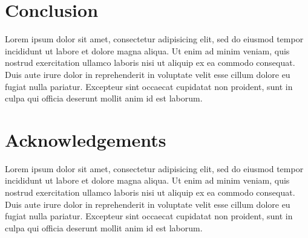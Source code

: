 \documentclass[conference]{acmsiggraph}
\begin{document}
\section{Conclusion}
\label{sec:conclusion}

Lorem ipsum dolor sit amet, consectetur adipisicing elit, sed do
eiusmod tempor incididunt ut labore et dolore magna aliqua. Ut enim ad
minim veniam, quis nostrud exercitation ullamco laboris nisi ut
aliquip ex ea commodo consequat. Duis aute irure dolor in
reprehenderit in voluptate velit esse cillum dolore eu fugiat nulla
pariatur. Excepteur sint occaecat cupidatat non proident, sunt in
culpa qui officia deserunt mollit anim id est laborum.

\section*{Acknowledgements}

Lorem ipsum dolor sit amet, consectetur adipisicing elit, sed do
eiusmod tempor incididunt ut labore et dolore magna aliqua. Ut enim ad
minim veniam, quis nostrud exercitation ullamco laboris nisi ut
aliquip ex ea commodo consequat. Duis aute irure dolor in
reprehenderit in voluptate velit esse cillum dolore eu fugiat nulla
pariatur. Excepteur sint occaecat cupidatat non proident, sunt in
culpa qui officia deserunt mollit anim id est laborum.

\nocite{*}


\end{document}
